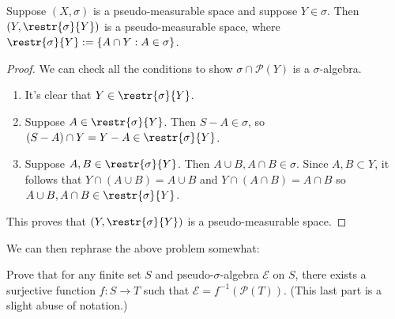 \documentclass[11pt,letterpaper]{article}
\begin{document}
\begin{lemma}\label{restrlemma}
    Suppose $(X, \sigma)$ is a pseudo-measurable space and suppose $Y\in\sigma$. Then $(Y, \restr{\sigma}{Y})$ is a pseudo-measurable space, where $\restr{\sigma}{Y} := \{ A\cap Y : A\in \sigma\}$.
\end{lemma}
\begin{proof}
    We can check all the conditions to show $\sigma\cap \mathcal{P}(Y)$ is a $\sigma$-algebra.
    \begin{enumerate}
        \item It's clear that $Y\in \restr{\sigma}{Y}$.
        \item Suppose $A\in \restr{\sigma}{Y}$. Then $S-A\in \sigma$, so $(S-A)\cap Y = Y-A\in \restr{\sigma}{Y}$.
        \item Suppose $A,B \in \restr{\sigma}{Y}$. Then $A\cup B, A\cap B\in \sigma$. Since $A,B\subset Y$, it follows that $Y\cap (A\cup B) = A\cup B$ and $Y \cap (A\cap B) = A\cap B$ so $A\cup B, A\cap B\in \restr{\sigma}{Y}$.
    \end{enumerate}
    This proves that $\left(Y, \restr{\sigma}{Y}\right)$ is a pseudo-measurable space. 
\end{proof}

We can then rephrase the above problem somewhat:

\begin{lemma}
    Prove that for any finite set $S$ and pseudo-$\sigma$-algebra $\mathcal{E}$ on $S$, there exists a surjective function $f : S \to T$ such that $\mathcal{E}=f^{-1}(\mathcal{P}(T))$. (This last part is a slight abuse of notation.)
\end{lemma}
\end{document}
